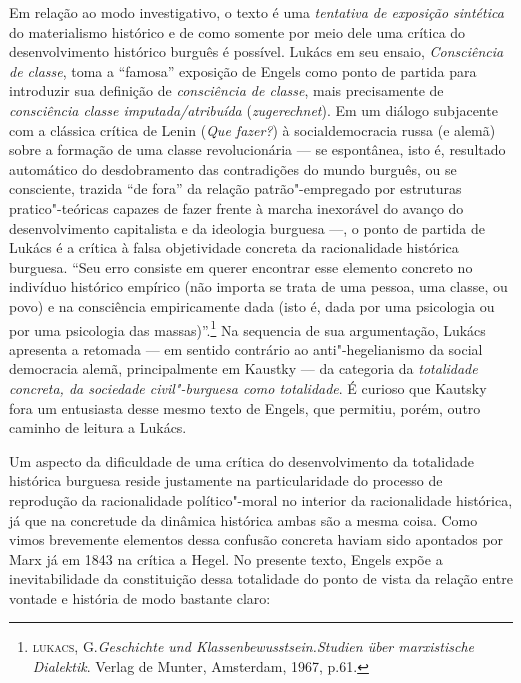 Em relação ao modo investigativo, o texto é uma \emph{tentativa de
exposição sintética} do materialismo histórico e de como somente por
meio dele uma crítica do desenvolvimento histórico burguês é possível.
Lukács em seu ensaio, \emph{Consciência de classe}, toma a ``famosa''
exposição de Engels como ponto de partida para introduzir sua definição
de \emph{consciência de classe}, mais precisamente de \emph{consciência
classe imputada/atribuída} (\emph{zugerechnet}). Em um diálogo
subjacente com a clássica crítica de Lenin (\emph{Que fazer?}) à
socialdemocracia russa (e alemã) sobre a formação de uma classe
revolucionária --- se espontânea, isto é, resultado automático do
desdobramento das contradições do mundo burguês, ou se consciente,
trazida ``de fora'' da relação patrão"-empregado por estruturas
pratico"-teóricas capazes de fazer frente à marcha inexorável do avanço
do desenvolvimento capitalista e da ideologia burguesa ---, o ponto de
partida de Lukács é a crítica à falsa objetividade concreta da
racionalidade histórica burguesa. ``Seu erro consiste em querer
encontrar esse elemento concreto no indivíduo histórico empírico (não
importa se trata de uma pessoa, uma classe, ou povo) e na consciência
empiricamente dada (isto é, dada por uma psicologia ou por uma
psicologia das massas)''.\footnote{\textsc{lukacs}, G.\emph{Geschichte
  und Klassenbewusstsein.Studien über marxistische Dialektik}. Verlag de
  Munter, Amsterdam, 1967, p.61.} Na sequencia de sua argumentação,
Lukács apresenta a retomada --- em sentido contrário ao
anti"-hegelianismo da social democracia alemã, principalmente em Kaustky
--- da categoria da \emph{totalidade concreta, da sociedade
civil"-burguesa como totalidade}. É curioso que Kautsky fora um
entusiasta desse mesmo texto de Engels, que permitiu, porém, outro
caminho de leitura a Lukács.

Um aspecto da dificuldade de uma crítica do desenvolvimento da
totalidade histórica burguesa reside justamente na particularidade do
processo de reprodução da racionalidade político"-moral no interior da
racionalidade histórica, já que na concretude da dinâmica histórica
ambas são a mesma coisa. Como vimos brevemente elementos dessa confusão
concreta haviam sido apontados por Marx já em 1843 na crítica a Hegel.
No presente texto, Engels expõe a inevitabilidade da constituição dessa
totalidade do ponto de vista da relação entre vontade e história de modo
bastante claro:


